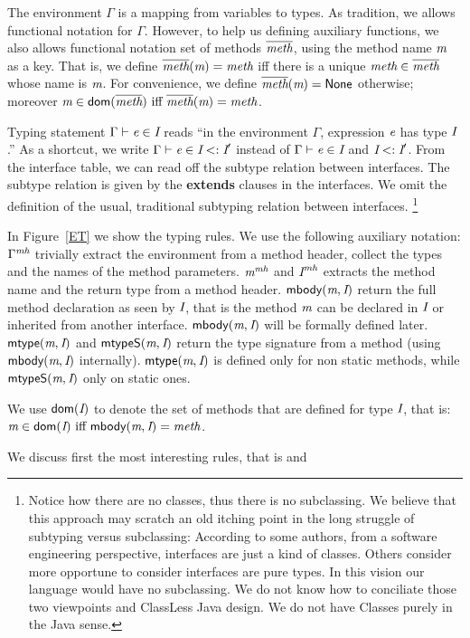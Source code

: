 The environment $\Gamma$ is a mapping from variables to types.
As tradition, we allows functional notation for $\Gamma$.
However, to help us defining auxiliary functions,
we also allows functional notation set of methods $\overline{\textit{meth}}$, using the method name $\textit{m}$ as a key.
That is, we define $\overline{\textit{meth}}(\textit{m})=\textit{meth}$ iff there is a unique $\textit{meth}\in\overline{\textit{meth}}$ whose name is $\textit{m}$.
For convenience, we define $\overline{\textit{meth}}(\textit{m})=\textsf{None}$ otherwise;
moreover $\m\in\dom(\methods)\ \miff\ \methods(\m)=\method$.

 Typing statement $\Gamma \vdash \textit{e}\in\textit{I}$ reads ``in the
environment $\Gamma$, expression $\textit{e}$ has type $\textit{I}$.''
As a shortcut, we write $\Gamma \vdash \textit{e}\in\textit{I}<:\textit{I}'$
instead of $\Gamma \vdash \textit{e}\in\textit{I}$ and $\textit{I}<:\textit{I}'$.
 From the interface table, we can read off the subtype relation between interfaces. The subtype relation is given by the \textbf{extends} clauses in the interfaces. We omit the definition of the usual, traditional subtyping relation between interfaces.%
\footnote{
Notice how there are no classes, thus there is no subclassing.
We believe that this approach may scratch an old itching point in the long struggle of subtyping versus subclassing:
According to some authors, from a software engineering perspective, interfaces are just a kind of classes. Others consider more opportune to  consider interfaces are pure types. In this vision our language would have no subclassing. We do not know how to conciliate those two viewpoints and ClassLess Java design. We do not have Classes purely in the Java sense.
}

In Figure~\ref{ET} we show the typing rules.
We use the following auxiliary notation:
$\Gamma^\textit{mh}$ trivially extract the environment from a method header, collect the types and the names of the method parameters.
$\textit{m}^\textit{mh}$ and $\textit{I}^\textit{mh}$ extracts the method name and the return type from a method header.
$\textsf{mbody}(\textit{m},\textit{I})$ return the full method declaration as seen by $\textit{I}$, that is the method $\textit{m}$ can be declared in $\textit{I}$ or inherited from another interface.
$\textsf{mbody}(\textit{m},\textit{I})$ will be formally defined later.
$\textsf{mtype}(\textit{m},\textit{I})$ and
$\textsf{mtypeS}(\textit{m},\textit{I})$ return the type signature from a method (using $\textsf{mbody}(\textit{m},\textit{I})$ internally).
$\textsf{mtype}(\textit{m},\textit{I})$ is defined only for non static methods, while
$\textsf{mtypeS}(\textit{m},\textit{I})$ only on static ones.

We use $\textsf{dom}(\textit{I})$ to denote the set of methods that are defined for type $\textit{I}$, that is: $\m\in\dom(\C)\ \miff \ \mBody(\m,\C)=\method$.

We discuss first the most interesting rules, that is
 and   

